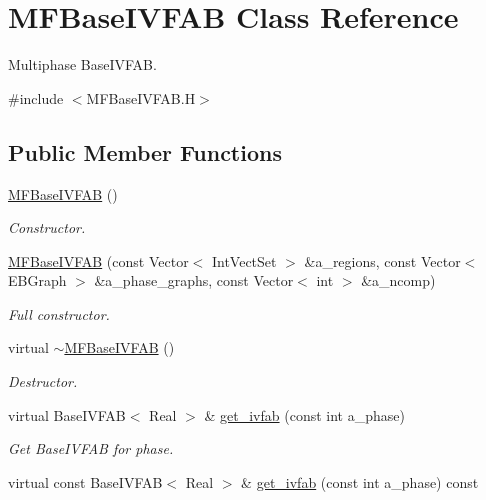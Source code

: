 \hypertarget{classMFBaseIVFAB}{}\section{M\+F\+Base\+I\+V\+F\+AB Class Reference}
\label{classMFBaseIVFAB}


Multiphase Base\+I\+V\+F\+AB.  




{\ttfamily \#include $<$M\+F\+Base\+I\+V\+F\+A\+B.\+H$>$}

\subsection*{Public Member Functions}
\begin{DoxyCompactItemize}
\item 
\hyperlink{classMFBaseIVFAB_a1ea286eecb86a3eb7986420d9ab71b6c}{M\+F\+Base\+I\+V\+F\+AB} ()
\begin{DoxyCompactList}\small\item\em Constructor. \end{DoxyCompactList}\item 
\hyperlink{classMFBaseIVFAB_a9b3287682597a077d67521e52cd35824}{M\+F\+Base\+I\+V\+F\+AB} (const Vector$<$ Int\+Vect\+Set $>$ \&a\+\_\+regions, const Vector$<$ E\+B\+Graph $>$ \&a\+\_\+phase\+\_\+graphs, const Vector$<$ int $>$ \&a\+\_\+ncomp)
\begin{DoxyCompactList}\small\item\em Full constructor. \end{DoxyCompactList}\item 
virtual \hyperlink{classMFBaseIVFAB_a95dd7ede6c71be1b7b5a2f23e906d9c4}{$\sim$\+M\+F\+Base\+I\+V\+F\+AB} ()
\begin{DoxyCompactList}\small\item\em Destructor. \end{DoxyCompactList}\item 
virtual Base\+I\+V\+F\+AB$<$ Real $>$ \& \hyperlink{classMFBaseIVFAB_a2f91b7f67ae748d5ae41d28071047f28}{get\+\_\+ivfab} (const int a\+\_\+phase)
\begin{DoxyCompactList}\small\item\em Get Base\+I\+V\+F\+AB for phase. \end{DoxyCompactList}\item 
virtual const Base\+I\+V\+F\+AB$<$ Real $>$ \& \hyperlink{classMFBaseIVFAB_a9803fd65d5f392f3bf8983991f46e0b4}{get\+\_\+ivfab} (const int a\+\_\+phase) const 

\end{DoxyCompactItemize}
